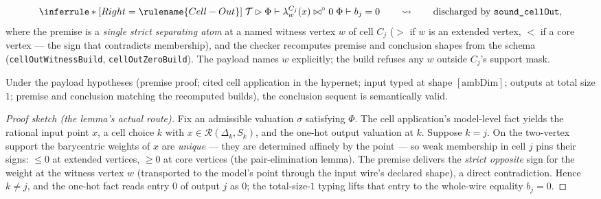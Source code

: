 

\begin{brecipe}
\label{rec:co-realized}
\[
\inferrule*[Right=\rulename{Cell-Out}]
  {\;\mathcal{T} \rhd \Phi \vdash \lambda^{C_j}_w(x) \bowtie^{\circ} 0\;}
  {\Phi \vdash b_j = 0}
\qquad\rightsquigarrow\qquad
\text{\upshape discharged by } \texttt{sound\_cellOut},
\]
where the premise is a \emph{single strict separating atom} at a named
witness vertex $w$ of cell $C_j$ ($>$ if $w$ is an extended vertex, $<$
if a core vertex --- the sign that contradicts membership), and the
checker recomputes premise and conclusion shapes from the schema
(\texttt{cellOutWitnessBuild}, \texttt{cellOutZeroBuild}). The payload
names $w$ explicitly; the build refuses any $w$ outside $C_j$'s support
mask.
\end{brecipe}

\begin{bprop}\label{prop:co-sound}
Under the payload hypotheses (premise proof; cited cell application in
the hypernet; input typed at shape $[\mathrm{ambDim}]$; outputs at total
size $1$; premise and conclusion matching the recomputed builds), the
conclusion sequent is semantically valid.
\end{bprop}
\begin{proof}[Proof sketch (the lemma's actual route)]
Fix an admissible valuation $\sigma$ satisfying $\Phi$. The cell
application's model-level fact yields the rational input point $x$, a
cell choice $k$ with $x \in \mathcal{R}(\Delta_k, S_k)$, and the
one-hot output valuation at $k$. Suppose $k = j$. On the two-vertex
support the barycentric weights of $x$ are \emph{unique} --- they are
determined affinely by the point --- so weak membership in cell $j$
pins their signs: $\leq 0$ at extended vertices, $\geq 0$ at core
vertices (the pair-elimination lemma). The premise delivers the
\emph{strict opposite} sign for the weight at the witness vertex $w$
(transported to the model's point through the input wire's declared
shape), a direct contradiction. Hence $k \neq j$, and the one-hot fact
reads entry $0$ of output $j$ as $0$; the total-size-$1$ typing lifts
that entry to the whole-wire equality $b_j = 0$.
\end{proof}

